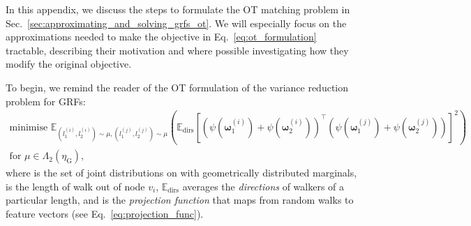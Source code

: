 In this appendix, we discuss the steps to formulate the OT matching problem in Sec.~\ref{sec:approximating_and_solving_grfs_ot}. 
We will especially focus on the approximations needed to make the objective in Eq.~\ref{eq:ot_formulation} tractable, describing their motivation and where possible investigating how they modify the original objective. 

To begin, we remind the reader of the OT formulation of the variance reduction problem for GRFs:
\small
\begin{equation} \begin{multlined} \label{eq:app_ot_formulation}
    \textrm{minimise }   \mathbb{E}_{(l_1^{(i)},l_2^{(i)}) \sim \mu, (l_1^{(j)},l_2^{(j)}) \sim \mu}  \left ( \mathbb{E}_\textrm{dirs} \left [ \left( \psi( \boldsymbol{\omega}_{1}^{(i)}) + \psi( \boldsymbol{\omega}_{2}^{(i)}) \right)^\top \left( \psi( \boldsymbol{\omega}_{1}^{(j)}) + \psi( \boldsymbol{\omega}_{2}^{(j)}) \right) \right]^2 \right)  
    \\ \textrm{for } \mu \in \Lambda_2(\eta_\textrm{G}),
\end{multlined}    
\end{equation}
\normalsize
where  is the set of joint distributions on  with geometrically distributed marginals,  is the length of walk  out of node $v_i$, $\mathbb{E}_\textrm{dirs}$ averages the \emph{directions} of walkers of a particular length, and  is the \emph{projection function} that maps from random walks to feature vectors (see Eq.~\ref{eq:projection_func}). 

